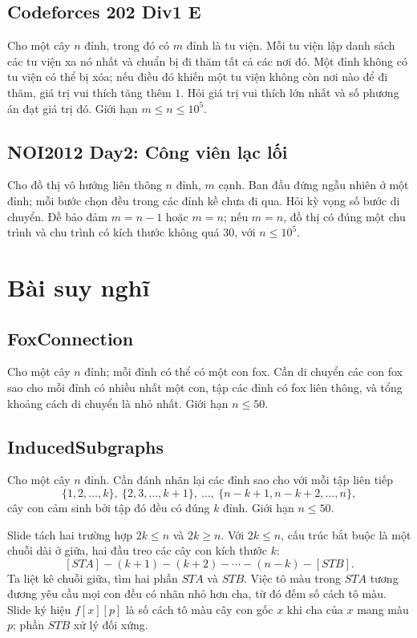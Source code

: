 \documentclass[11pt]{article}
\begin{document}
\subsection{Codeforces 202 Div1 E}

Cho một cây \(n\) đỉnh, trong đó có \(m\) đỉnh là tu viện. Mỗi tu viện lập danh
sách các tu viện xa nó nhất và chuẩn bị đi thăm tất cả các nơi đó. Một đỉnh
không có tu viện có thể bị xóa; nếu điều đó khiến một tu viện không còn nơi nào
để đi thăm, giá trị vui thích tăng thêm \(1\). Hỏi giá trị vui thích lớn nhất và
số phương án đạt giá trị đó. Giới hạn \(m \le n \le 10^5\).

\subsection{NOI2012 Day2: Công viên lạc lối}

Cho đồ thị vô hướng liên thông \(n\) đỉnh, \(m\) cạnh. Ban đầu đứng ngẫu nhiên
ở một đỉnh; mỗi bước chọn đều trong các đỉnh kề chưa đi qua. Hỏi kỳ vọng số
bước di chuyển. Đề bảo đảm \(m=n-1\) hoặc \(m=n\); nếu \(m=n\), đồ thị có đúng
một chu trình và chu trình có kích thước không quá \(30\), với \(n\le 10^5\).

\section{Bài suy nghĩ}

\subsection{FoxConnection}

Cho một cây \(n\) đỉnh; mỗi đỉnh có thể có một con fox. Cần di chuyển các con
fox sao cho mỗi đỉnh có nhiều nhất một con, tập các đỉnh có fox liên thông, và
tổng khoảng cách di chuyển là nhỏ nhất. Giới hạn \(n \le 50\).

\subsection{InducedSubgraphs}

Cho một cây \(n\) đỉnh. Cần đánh nhãn lại các đỉnh sao cho với mỗi tập liên tiếp
\[
  \{1,2,\ldots,k\},\ \{2,3,\ldots,k+1\},\ \ldots,\ 
  \{n-k+1,n-k+2,\ldots,n\},
\]
cây con cảm sinh bởi tập đó đều có đúng \(k\) đỉnh. Giới hạn \(n\le 50\).

Slide tách hai trường hợp \(2k\le n\) và \(2k\ge n\). Với \(2k\le n\), cấu trúc
bắt buộc là một chuỗi dài ở giữa, hai đầu treo các cây con kích thước \(k\):
\[
  [STA] - (k+1) - (k+2) - \cdots - (n-k) - [STB].
\]
Ta liệt kê chuỗi giữa, tìm hai phần \(STA\) và \(STB\). Việc tô màu trong
\(STA\) tương đương yêu cầu mọi con đều có nhãn nhỏ hơn cha, từ đó đếm số cách
tô màu. Slide ký hiệu \(f[x][p]\) là số cách tô màu cây con gốc \(x\) khi cha
của \(x\) mang màu \(p\); phần \(STB\) xử lý đối xứng.
\end{document}
